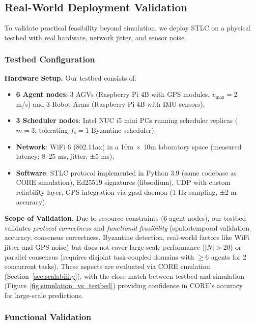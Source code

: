 \documentclass[lettersize,journal]{IEEEtran}
\begin{document}
\subsection{Real-World Deployment Validation}
\label{sec:real_world_validation}

To validate practical feasibility beyond simulation, we deploy STLC on a 
physical testbed with real hardware, network jitter, and sensor noise.

\subsubsection{Testbed Configuration}
\label{sec:testbed_config}

\textbf{Hardware Setup.} Our testbed consists of:
\begin{itemize}
    \item \textbf{6 Agent nodes}: 3 AGVs (Raspberry Pi 4B with GPS modules, 
          $v_{\max} = 2$ m/s) and 3 Robot Arms (Raspberry Pi 4B with IMU sensors),
    \item \textbf{3 Scheduler nodes}: Intel NUC i5 mini PCs running scheduler 
          replicas ($m=3$, tolerating $f_s=1$ Byzantine scheduler),
    \item \textbf{Network}: WiFi 6 (802.11ax) in a 10m × 10m laboratory 
          space (measured latency: 8--25 ms, jitter: ±5 ms),
    \item \textbf{Software}: STLC protocol implemented in Python 3.9 (same 
          codebase as CORE simulation), Ed25519 signatures (libsodium), 
          UDP with custom reliability layer, GPS integration via gpsd 
          daemon (1 Hz sampling, ±2 m accuracy).
\end{itemize}

\textbf{Scope of Validation.} Due to resource constraints (6 agent nodes), 
our testbed validates \textit{protocol correctness} and \textit{functional 
feasibility} (spatiotemporal validation accuracy, consensus correctness, 
Byzantine detection, real-world factors like WiFi jitter and GPS noise) 
but does not cover large-scale performance ($|N| > 20$) or parallel 
consensus (requires disjoint task-coupled domains with $\geq 6$ agents for 
2 concurrent tasks). These aspects are evaluated via CORE emulation 
(Section~\ref{sec:scalability}), with the close match between testbed and 
simulation (Figure~\ref{fig:simulation_vs_testbed}) providing confidence 
in CORE's accuracy for large-scale predictions.

\subsubsection{Functional Validation}
\label{sec:functional_validation}
\end{document}
